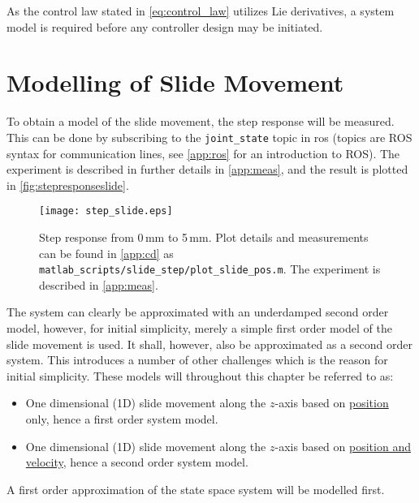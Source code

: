 As the control law stated in \autoref{eq:control_law} utilizes Lie derivatives, a system model is required before any controller design may be initiated.
\section{Modelling of Slide Movement}\label{sec:model_slide}
To obtain a model of the slide movement, the step response will be measured.  This can be done by subscribing to the \texttt{joint\_state} topic in \gls{ros} (topics are ROS syntax for communication lines, see \autoref{app:ros} for an introduction to ROS). The experiment is described in further details in \autoref{app:meas}, and the result is plotted in \autoref{fig:stepresponseslide}. 
\begin{figure}[H]
\center
\texttt{[image: step\_slide.eps]}
\caption{Step response from 0\,mm to 5\,mm. Plot details and measurements can be found in \autoref{app:cd} as \texttt{matlab\_scripts/slide\_step/plot\_slide\_pos.m}. The experiment is described in \autoref{app:meas}.}
\label{fig:stepresponseslide}
\end{figure}
The system can clearly be approximated with an underdamped second order model, however, for initial simplicity, merely a simple first order model of the slide movement is used. It shall, however, also be approximated as a second order system. This introduces a number of other challenges which is the reason for initial simplicity. These models will throughout this chapter be referred to as:
\begin{itemize}
\item One dimensional (1D) slide movement along the $z$-axis based on \underline{position} only, hence a first order system model.
\item One dimensional (1D) slide movement along the $z$-axis based on \underline{position and velocity}, hence a second order system model.
\end{itemize}
A first order approximation of the state space system will be modelled first. 
